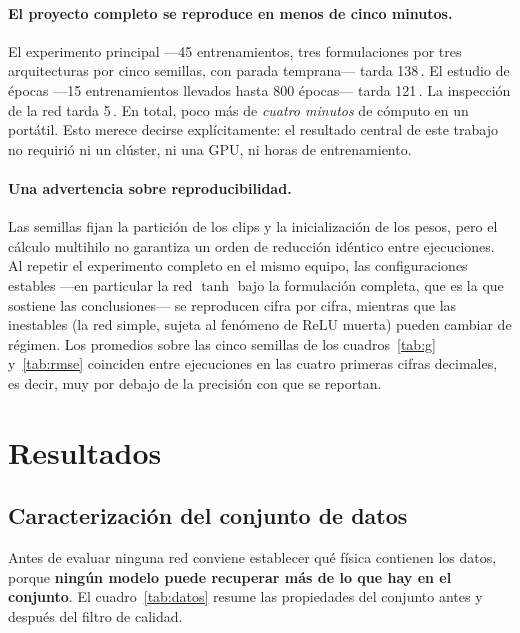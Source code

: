 \documentclass[titlepage,11pt]{article}
\providecommand{\SI}[2]{#1\,#2}
\begin{document}
\paragraph{El proyecto completo se reproduce en menos de cinco minutos.} El
experimento principal ---45 entrenamientos, tres formulaciones por tres
arquitecturas por cinco semillas, con parada temprana--- tarda
\SI{138}{\second}. El estudio de épocas ---15 entrenamientos llevados hasta 800
épocas--- tarda \SI{121}{\second}. La inspección de la red tarda
\SI{5}{\second}. En total, poco más de \emph{cuatro minutos} de cómputo en un
portátil. Esto merece decirse explícitamente: el resultado central de este
trabajo no requirió ni un clúster, ni una GPU, ni horas de entrenamiento. 

\paragraph{Una advertencia sobre reproducibilidad.} Las semillas fijan la
partición de los clips y la inicialización de los pesos, pero el cálculo
multihilo no garantiza un orden de reducción idéntico entre ejecuciones. Al
repetir el experimento completo en el mismo equipo, las configuraciones
estables ---en particular la red $\tanh$ bajo la formulación completa, que es
la que sostiene las conclusiones--- se reproducen cifra por cifra, mientras que
las inestables (la red simple, sujeta al fenómeno de ReLU muerta) pueden
cambiar de régimen. Los promedios sobre las cinco semillas de los
cuadros~\ref{tab:g} y~\ref{tab:rmse} coinciden entre ejecuciones en las cuatro
primeras cifras decimales, es decir, muy por debajo de la precisión con que se
reportan.


\section{Resultados}
\label{sec:resultados}

\subsection{Caracterización del conjunto de datos}
\label{subsec:datos_res}

Antes de evaluar ninguna red conviene establecer qué física contienen los
datos, porque \textbf{ningún modelo puede recuperar más de lo que hay en el
conjunto}. El cuadro~\ref{tab:datos} resume las propiedades del conjunto antes y
después del filtro de calidad.
\end{document}

